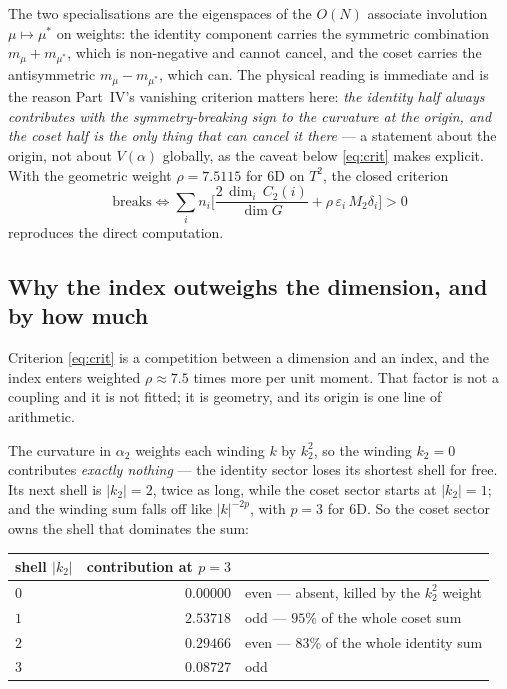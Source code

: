 \documentclass[11pt,a4paper]{article}
\begin{document}
The two specialisations are the eigenspaces of the $O(N)$ associate involution $\mu\mapsto\mu^*$ on
weights: the identity component carries the symmetric combination $m_\mu+m_{\mu^*}$, which is
non-negative and cannot cancel, and the coset carries the antisymmetric $m_\mu-m_{\mu^*}$, which
can. The physical reading is immediate and is the reason Part~IV's vanishing criterion matters here:
\emph{the identity half always contributes with the symmetry-breaking sign to the curvature at the
origin, and the coset half is the only thing that can cancel it there} --- a statement about the
origin, not about $V(\alpha)$ globally, as the caveat below \eqref{eq:crit} makes explicit. With the
geometric weight $\rho=7.5115$ for 6D on $T^2$, the closed
criterion
\begin{equation}\label{eq:crit}
\text{breaks}\iff \sum_i n_i\Big[\frac{2\,\dim_i\,C_2(i)}{\dim G}+\rho\,\varepsilon_i\,M_2\delta_i\Big] > 0
\end{equation}
reproduces the direct computation.

\subsection*{Why the index outweighs the dimension, and by how much}

Criterion \eqref{eq:crit} is a competition between a dimension and an index, and the index enters
weighted $\rho\approx7.5$ times more per unit moment. That factor is not a coupling and it is not
fitted; it is geometry, and its origin is one line of arithmetic.

The curvature in $\alpha_2$ weights each winding $k$ by $k_2^2$, so the winding $k_2=0$ contributes
\emph{exactly nothing} --- the identity sector loses its shortest shell for free. Its next shell is
$|k_2|=2$, twice as long, while the coset sector starts at $|k_2|=1$; and the winding sum falls off
like $|k|^{-2p}$, with $p=3$ for 6D. So the coset sector owns the shell that dominates the sum:

\begin{center}\small
{}
\begin{tabular}{lrl}
\toprule
\rowcolor{hdrblue!14}shell $|k_2|$ & contribution at $p=3$ & \\
\midrule
$0$ & $0.00000$ & even --- absent, killed by the $k_2^2$ weight\\
$1$ & $2.53718$ & odd --- $95\%$ of the whole coset sum\\
$2$ & $0.29466$ & even --- $83\%$ of the whole identity sum\\
$3$ & $0.08727$ & odd\\
\bottomrule
\end{tabular}
\end{center}
\end{document}
